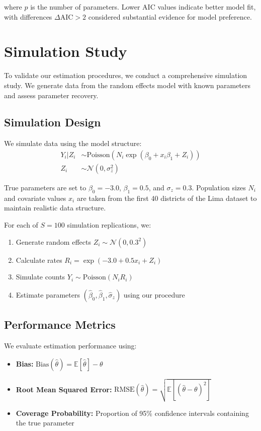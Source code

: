 \documentclass[11pt]{article}
\begin{document}
where $p$ is the number of parameters. Lower AIC values indicate better model fit, with differences $\Delta\text{AIC} > 2$ considered substantial evidence for model preference.

\section{Simulation Study}

To validate our estimation procedures, we conduct a comprehensive simulation study. We generate data from the random effects model with known parameters and assess parameter recovery.

\subsection{Simulation Design}

We simulate data using the model structure:
\begin{align}
Y_i | Z_i &\sim \text{Poisson}(N_i \exp(\beta_0 + x_i \beta_1 + Z_i)) \\
Z_i &\sim \mathcal{N}(0, \sigma_z^2)
\end{align}

True parameters are set to $\beta_0 = -3.0$, $\beta_1 = 0.5$, and $\sigma_z = 0.3$. Population sizes $N_i$ and covariate values $x_i$ are taken from the first 40 districts of the Lima dataset to maintain realistic data structure.

For each of $S = 100$ simulation replications, we:
\begin{enumerate}
\item Generate random effects $Z_i \sim \mathcal{N}(0, 0.3^2)$
\item Calculate rates $R_i = \exp(-3.0 + 0.5 x_i + Z_i)$
\item Simulate counts $Y_i \sim \text{Poisson}(N_i R_i)$
\item Estimate parameters $(\hat{\beta}_0, \hat{\beta}_1, \hat{\sigma}_z)$ using our procedure
\end{enumerate}

\subsection{Performance Metrics}

We evaluate estimation performance using:
\begin{itemize}
\item \textbf{Bias:} $\text{Bias}(\hat{\theta}) = \mathbb{E}[\hat{\theta}] - \theta$
\item \textbf{Root Mean Squared Error:} $\text{RMSE}(\hat{\theta}) = \sqrt{\mathbb{E}[(\hat{\theta} - \theta)^2]}$
\item \textbf{Coverage Probability:} Proportion of 95\% confidence intervals containing the true parameter
\end{itemize}
\end{document}

